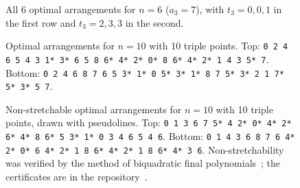 \begin{figure}[t]
\centering
{}\ngap{}\ngap{}\par\vspace{1mm}
\ngap{}\ngap{}
\caption{All 6 optimal arrangements for $n=6$ ($a_3=7$), with $t_3=0,0,1$ in the first row and $t_3=2,3,3$ in the second.}
\label{fig:n6-all}
\end{figure}

\begin{figure}[p]
\centering
\begin{minipage}{0.685\linewidth}\end{minipage}\par\vspace{1mm}
\begin{minipage}{0.685\linewidth}\end{minipage}
\caption{Optimal arrangements for $n=10$ with 10 triple points. Top: \texttt{0 2 4 6 5 4 3 1* 3* 6 5 8 6* 4* 2* 0* 8 6* 4* 2* 1 4 3 5* 7}. Bottom: \texttt{0 2 4 6 8 7 6 5 3* 1* 0 5* 3* 1* 8 7 5* 3* 2 1 7* 5* 3* 5 7}.}
\label{fig:n10}
\end{figure}

\begin{figure}[p]
\centering
\begin{minipage}{0.785\linewidth}\end{minipage}\par\vspace{1mm}
\begin{minipage}{0.785\linewidth}\end{minipage}
\caption{Non-stretchable optimal arrangements for $n=10$ with 10 triple points, drawn with pseudolines. Top: \texttt{0 1 3 6 7 5* 4 2* 0* 4* 2* 6* 4* 8 6* 5 3* 1* 0 3 4 6 5 4 6}. Bottom: \texttt{0 1 4 3 6 8 7 6 4* 2* 0* 6 4* 2* 1 8 6* 4* 2* 1 8 6* 4* 3 6}.
  Non-stretchability was verified by the method of biquadratic final polynomials~\cite{br90}; the certificates are in the repository~\cite{nonsimple-arrangements}.}
\label{fig:n10-nonstretchable}
\end{figure}

